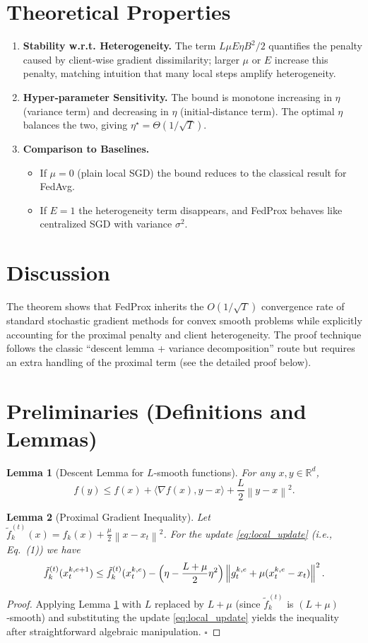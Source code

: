 \documentclass{article}
\newtheorem{lemma}{Lemma}
\newcommand{\norm}[1]{\left\lVert #1\right\rVert}
\newcommand{\ip}[2]{\langle #1,#2\rangle}
\begin{document}
\section*{Theoretical Properties}
\begin{enumerate}[label=\arabic*.]
\item \textbf{Stability w.r.t. Heterogeneity.} The term $L\mu E\eta B^2/2$ quantifies the penalty caused by client‑wise gradient dissimilarity; larger $\mu$ or $E$ increase this penalty, matching intuition that many local steps amplify heterogeneity.
\item \textbf{Hyper‑parameter Sensitivity.} The bound is monotone increasing in $\eta$ (variance term) and decreasing in $\eta$ (initial‑distance term). The optimal $\eta$ balances the two, giving $\eta^\star = \Theta(1/\sqrt{T})$.
\item \textbf{Comparison to Baselines.}
    \begin{itemize}
        \item If $\mu=0$ (plain local SGD) the bound reduces to the classical result for FedAvg.
        \item If $E=1$ the heterogeneity term disappears, and FedProx behaves like centralized SGD with variance $\sigma^2$.
    \end{itemize}
\end{enumerate}

\section*{Discussion}
The theorem shows that FedProx inherits the $O(1/\sqrt{T})$ convergence rate of standard stochastic gradient methods for convex smooth problems while explicitly accounting for the proximal penalty and client heterogeneity. The proof technique follows the classic “descent lemma + variance decomposition” route but requires an extra handling of the proximal term (see the detailed proof below).

\newpage
\section*{Preliminaries (Definitions and Lemmas)}
\begin{lemma}[Descent Lemma for $L$‑smooth functions]\label{lem:descent}
For any $x,y\in\mathbb{R}^d$,
\[
f(y)\le f(x)+\ip{\nabla f(x)}{y-x}+\frac{L}{2}\norm{y-x}^2 .
\]
\end{lemma}
\begin{lemma}[Proximal Gradient Inequality]\label{lem:prox}
Let $\tilde f_k^{(t)}(x)=f_k(x)+\frac{\mu}{2}\norm{x-x_t}^2$. For the update \eqref{eq:local_update} (i.e., Eq.~(1)) we have
\[
\tilde f_k^{(t)}(x_{t}^{k,e+1})\le \tilde f_k^{(t)}(x_{t}^{k,e})-\Bigl(\eta-\frac{L+\mu}{2}\eta^2\Bigr)\norm{g_{t}^{k,e}+\mu(x_{t}^{k,e}-x_t)}^2 .
\]
\end{lemma}
\begin{proof}
Applying Lemma \ref{lem:descent} with $L$ replaced by $L+\mu$ (since $\tilde f_k^{(t)}$ is $(L+\mu)$‑smooth) and substituting the update \eqref{eq:local_update} yields the inequality after straightforward algebraic manipulation. $\square$
\end{proof}
\end{document}
